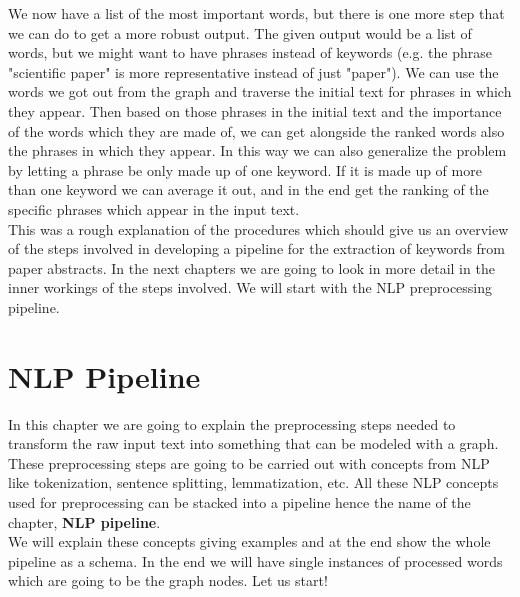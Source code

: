 \documentclass[12pt]{article}
\numberwithin{equation}{section}
\begin{document}
\begin{spacing}{1.5}
	We now have a list of the most important words, but there is one more step that we can do to get a more robust output. The given output would be a list of words, but we might want to have phrases instead of keywords (e.g. the phrase "scientific paper" is more representative instead of just "paper"). We can use the words we got out from the graph and traverse the initial text for phrases in which they appear. Then based on those phrases in the initial text and the importance of the words which they are made of, we can get alongside the ranked words also the phrases in which they appear. In this way we can also generalize the problem by letting a phrase be only made up of one keyword. If it is made up of more than one keyword we can average it out, and in the end get the ranking of the specific phrases which appear in the input text. \\
	This was a rough explanation of the procedures which should give us an overview of the steps involved in developing a pipeline for the extraction of keywords from paper abstracts. In the next chapters we are going to look in more detail in the inner workings of the steps involved. We will start with the NLP preprocessing pipeline.
	
	
	\newpage
	\section{NLP Pipeline}
	In this chapter we are going to explain the preprocessing steps needed to transform the raw input text into something that can be modeled with a graph. These preprocessing steps are going to be carried out with concepts from NLP like tokenization, sentence splitting, lemmatization, etc. All these NLP concepts used for preprocessing can be stacked into a pipeline hence the name of the chapter, \textbf{NLP pipeline}.\\
	We will explain these concepts giving examples and at the end show the whole pipeline as a schema. In the end we will have single instances of processed words which are going to be the graph nodes. Let us start!
	

\end{spacing}
\end{document}
